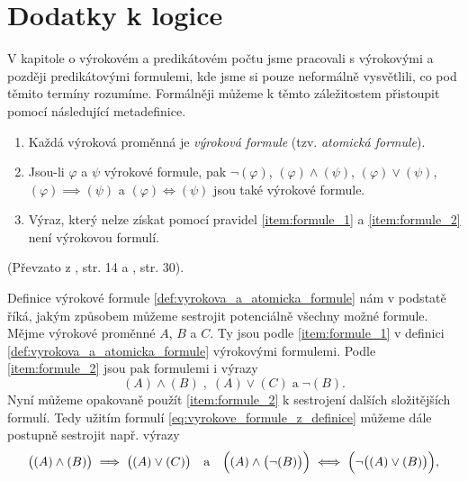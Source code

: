 \chapter{Dodatky k logice}\label{chap:dodatky_k_logice}
V kapitole o výrokovém a predikátovém počtu jsme pracovali s výrokovými a později predikátovými formulemi, kde jsme si pouze neformálně vysvětlili, co pod těmito termíny rozumíme. Formálněji můžeme k těmto záležitostem přistoupit pomocí následující metadefinice.
\begin{definition}\label{def:vyrokova_a_atomicka_formule}
    
    \begin{enumerate}[label=(\roman*)]
        \item\label{item:formule_1} Každá výroková proměnná je \emph{výroková formule} (tzv. \emph{atomická formule}).
        \item\label{item:formule_2} Jsou-li $\varphi$ a $\psi$ výrokové formule, pak $\neg (\varphi)$, $(\varphi) \land (\psi)$, $(\varphi) \lor (\psi)$, $(\varphi) \implies (\psi)$ a $(\varphi) \iff (\psi)$ jsou také výrokové formule.
        \item\label{item:formule_3} Výraz, který nelze získat pomocí pravidel \ref{item:formule_1} a \ref{item:formule_2} není výrokovou formulí.
    \end{enumerate}
\end{definition}
(Převzato z \cite{Fuchs2003}, str. 14 a \cite{BalcarStepanek1986}, str. 30).\par
Definice výrokové formule \ref{def:vyrokova_a_atomicka_formule} nám v podstatě říká, jakým způsobem můžeme sestrojit potenciálně všechny možné formule. Mějme výrokové proměnné $A$, $B$ a $C$. Ty jsou podle \ref{item:formule_1} v definici \ref{def:vyrokova_a_atomicka_formule} výrokovými formulemi. Podle \ref{item:formule_2} jsou pak formulemi i výrazy
\begin{equation}\label{eq:vyrokove_formule_z_definice}
    (A) \land (B)\;,\;(A) \lor (C)\;\text{a}\;\neg(B).
\end{equation}
Nyní můžeme opakovaně použít \ref{item:formule_2} k sestrojení dalších složitějších formulí. Tedy užitím formulí \eqref{eq:vyrokove_formule_z_definice} můžeme dále postupně sestrojit např. výrazy
\begin{equation*}
    \bigl((A) \land (B)\bigr) \implies \bigl((A) \lor (C)\bigr)\quad\text{a}\quad\Bigl((A) \land \bigl(\neg(B)\bigr)\Bigr) \iff \Bigl(\neg\bigl((A) \lor (B)\bigr)\Bigr),
\end{equation*}
